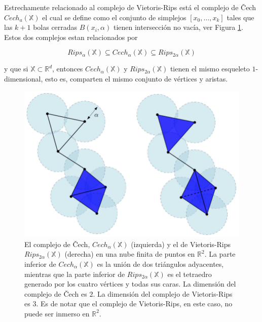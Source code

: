 Estrechamente relacionado al complejo de Vietoris-Rips est\'a el complejo de
\v Cech $Cech_{a}\left(\mathbb{X}\right)$ el cual se define como el conjunto de simplejos
$\left[x_{0}, \dots, x_{k}\right]$ tales que las $k + 1$ bolas cerradas $B\left(x_{i},\alpha\right)$
tienen intersecci\'on no vac\'ia, ver Figura \ref{fig:Figura 2}. Estos dos complejos estan relacionados por

\begin{equation*}
    Rips_{\alpha}\left(\mathbb{X}\right)\subseteq
    Cech_{\alpha}\left(\mathbb{X}\right)\subseteq
    Rips_{2\alpha}\left(\mathbb{X}\right)
\end{equation*}

\noindent y que si $\mathbb{X}\subset\mathbb{R}^{d}$, entonces $Cech_{\alpha}\left(\mathbb{X}\right)$ y
$Rips_{2\alpha}\left(\mathbb{X}\right)$ tienen el mismo esqueleto $1$-dimensional, esto es, comparten el
mismo conjunto de v\'ertices y aristas.

\begin{figure}[ht]
    \centering
    \includegraphics[width=0.85\linewidth]{./figures/Figura2_c1.png}
    \caption{
        El complejo de \v Cech, $Cech_{\alpha}\left(\mathbb{X}\right)$ (izquierda) y el de Vietoris-Rips
        $Rips_{2\alpha}\left(\mathbb{X}\right)$ (derecha) en una nube finita de puntos en
        $\mathbb{R}^{2}$. La parte inferior de $Cech_{\alpha}\left(\mathbb{X}\right)$ es la uni\'on de
        dos tri\'angulos adyacentes, mientras que la parte inferior de
        $Rips_{2\alpha}\left(\mathbb{X}\right)$ es el tetraedro generado por los cuatro v\'ertices
        y todas sus caras. La dimensi\'on del complejo de \v Cech es $2$. La dimensi\'on del complejo
        de Vietoris-Rips es $3$. Es de notar que el complejo de Vietoris-Rips, en este caso, no puede ser inmerso en $\mathbb{R}^{2}$.
    }
    \label{fig:Figura 2}
    \vspace{15pt}
\end{figure}

